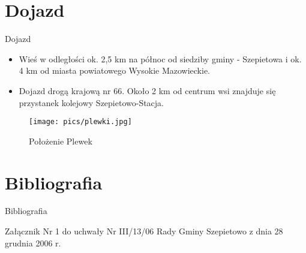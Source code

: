 \documentclass{beamer}
\begin{document}
\section {Dojazd}
\begin{frame}{Dojazd}
\begin{itemize}
\item Wieś w odległości ok. 2,5 km na północ od siedziby gminy - Szepietowa i ok. 4 km od miasta powiatowego Wysokie Mazowieckie.

\item Dojazd drogą krajową nr 66. Około 2 km od centrum wsi znajduje się przystanek kolejowy Szepietowo-Stacja.
\end{itemize}
\end{frame}
\begin{frame}
\begin {center}
\begin{figure}
\texttt{[image: pics/plewki.jpg]}
\caption{Położenie Plewek}\label{fig:plewki}
\end{figure}
\end{center}
\end {frame}
\section {Bibliografia}
\begin{frame}{Bibliografia}
\begin{thebibliography}{99}
  Załącznik Nr 1 do uchwały Nr III/13/06 Rady Gminy Szepietowo z dnia 28 grudnia 2006 r.
\end {thebibliography}
\end{frame}
\end{document}

